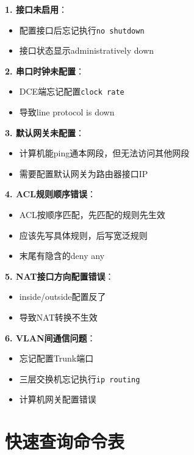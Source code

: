 \documentclass[12pt,a4paper]{ctexart}
\begin{document}
\begin{exambox}[配置常见错误]
\textbf{1. 接口未启用}：
\begin{itemize}[itemsep=0pt]
    \item 配置接口后忘记执行\texttt{no shutdown}
    \item 接口状态显示administratively down
\end{itemize}

\textbf{2. 串口时钟未配置}：
\begin{itemize}[itemsep=0pt]
    \item DCE端忘记配置\texttt{clock rate}
    \item 导致line protocol is down
\end{itemize}

\textbf{3. 默认网关未配置}：
\begin{itemize}[itemsep=0pt]
    \item 计算机能ping通本网段，但无法访问其他网段
    \item 需要配置默认网关为路由器接口IP
\end{itemize}

\textbf{4. ACL规则顺序错误}：
\begin{itemize}[itemsep=0pt]
    \item ACL按顺序匹配，先匹配的规则先生效
    \item 应该先写具体规则，后写宽泛规则
    \item 末尾有隐含的deny any
\end{itemize}

\textbf{5. NAT接口方向配置错误}：
\begin{itemize}[itemsep=0pt]
    \item inside/outside配置反了
    \item 导致NAT转换不生效
\end{itemize}

\textbf{6. VLAN间通信问题}：
\begin{itemize}[itemsep=0pt]
    \item 忘记配置Trunk端口
    \item 三层交换机忘记执行\texttt{ip routing}
    \item 计算机网关配置错误
\end{itemize}
\end{exambox}

\section{快速查询命令表}
\end{document}
